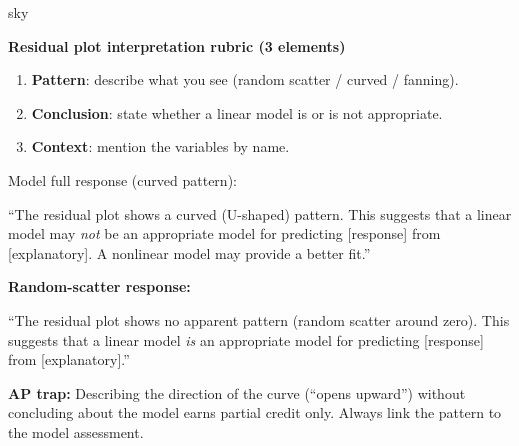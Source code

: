 \documentclass[10pt]{article}
\begin{document}
\begin{skillbox}{sky}
\begin{minipage}[t]{0.50\linewidth}
    \textbf{Residual plot interpretation rubric (3 elements)}
    \begin{enumerate}
        \item \textbf{Pattern}: describe what you see (random scatter / curved / fanning).
        \item \textbf{Conclusion}: state whether a linear model is or is not appropriate.
        \item \textbf{Context}: mention the variables by name.
    \end{enumerate}
    \medskip
    Model full response (curved pattern):
    \begin{tcolorbox}[colback=white,colframe=navy,boxrule=0.6pt,arc=1.5mm,
        left=2mm,right=2mm,top=1mm,bottom=1mm]
        \small``The residual plot shows a curved (U-shaped) pattern. This suggests that a
        linear model may \textit{not} be an appropriate model for predicting [response]
        from [explanatory]. A nonlinear model may provide a better fit.''
    \end{tcolorbox}
\end{minipage}
\hfill
\begin{minipage}[t]{0.46\linewidth}
    \textbf{Random-scatter response:}
    \begin{tcolorbox}[colback=white,colframe=navy,boxrule=0.6pt,arc=1.5mm,
        left=2mm,right=2mm,top=1mm,bottom=1mm]
        \small``The residual plot shows no apparent pattern (random scatter around zero).
        This suggests that a linear model \textit{is} an appropriate model for predicting
        [response] from [explanatory].''
    \end{tcolorbox}
    \medskip
    \textbf{AP trap:} Describing the direction of the curve (``opens upward'') without
    concluding about the model earns partial credit only. Always link the pattern to
    the model assessment.
\end{minipage}
\end{skillbox}
\end{document}
